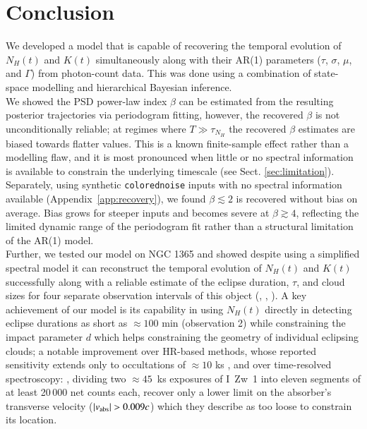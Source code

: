\documentclass{aa}
\begin{document}
\section{Conclusion}
\label{sec:conclusion}
We developed a model that is capable of recovering the temporal evolution of $N_H(t)$ and $K(t)$ simultaneously along with their AR(1) parameters ($\tau$, $\sigma$, $\mu$, and $\Gamma$) from photon-count data. This was done using a combination of state-space modelling and hierarchical Bayesian inference. \\
We showed the PSD power-law index $\beta$ can be estimated from the resulting posterior trajectories via periodogram fitting, however, the recovered $\beta$ is not unconditionally reliable; at regimes where $T \gg \tau_{N_H}$ the recovered $\beta$ estimates are biased towards flatter values. This is a known finite-sample effect rather than a modelling flaw, and it is most pronounced when little or no spectral information is available to constrain the underlying timescale (see Sect. \ref{sec:limitation}). Separately, using synthetic \texttt{colorednoise} inputs with no spectral information available (Appendix~\ref{app:recovery}), we found $\beta \lesssim 2$ is recovered without bias on average. Bias grows for steeper inputs and becomes severe at $\beta \gtrsim 4$, reflecting the limited dynamic range of the periodogram fit rather than a structural limitation of the AR(1) model. \\
Further, we tested our model on NGC 1365 and showed despite using a simplified spectral model it can reconstruct the temporal evolution of $N_H(t)$ and $K(t)$ successfully along with a reliable estimate of the eclipse duration, $\tau$, and cloud sizes for four separate observation intervals of this object (\citealt{Braito2014}, \citealt{Rivers2015}, \citealt{Pietrini2024}). A key achievement of our model is its capability in using $N_H(t)$ directly in detecting eclipse durations as short as $\approx 100$ min (observation 2) while constraining the impact parameter $d$ which helps constraining the geometry of individual eclipsing clouds; a notable improvement over HR-based methods, whose reported sensitivity extends only to occultations of $\approx 10$ ks \citep{Pietrini2024}, and over time-resolved spectroscopy: \citet{Huang2026}, dividing two $\approx 45$~ks exposures of I~Zw~1 into eleven segments of at least 20\,000 net counts each, recover only a lower limit on the absorber's transverse velocity ($|v_{\rm abs}| > 0.009c$) which they describe as too loose to constrain its location. \\
\end{document}
